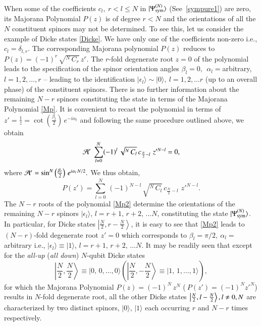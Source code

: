 When some of the coefficients $c_l,\ r< l\leq N$ in $\vert \Psi^{(N)}_{\rm sym}\rangle$ (See~\eqref{sympure1}) are zero, its Majorana Polynomial $P(z)$ is of degree $r<N$ and the orientations of all the $N$ constituent spinors may not be determined. To see this, let us consider the example of Dicke states \eqref{Dicke}. We have only one of the coefficients non-zero i.e., $c_l=\delta_{l,r}$.  The corresponding Majorana polynomial $P(z)$ reduces to  $P(z)=(-1)^r\, \sqrt{^N\, C_r}\, z^{r}$. The $r$-fold degenerate root  $z=0$ of the polynomial leads to the specification of the spinor orientation angles $\beta_l=0,\ \ \alpha_l=$arbitrary, $l=1,2,\ldots, r$ -- leading to the identification $\vert\epsilon_l\rangle\sim \vert 0\rangle,\ l=1,2,\ldots r$ (up to an overall phase) of the constituent spinors. There is no further information about the remaining $N-r$ spinors constituting the state in terms of the Majorana Polynomial \eqref{Mp}.  It is convenient to recast the  polynomial in terms of $z'=\frac{1}{z}=\cot \left(\frac{\beta_l}{2}\right)\,e^{-i\alpha_l}$ and following the same procedure outlined above, we obtain
\begin{equation}
{\cal A'}\  \sum_{l=0}^N (-1)^l\,\sqrt{^N\, C_l}\,  c_{\frac{N}{2}-l}\,  \, z'^{N-l}=0,\label{cmj03}  
\end{equation} 
where  ${\cal A'}=\sin^N\left(\frac{\beta_l}{2}\right)\,e^{i\alpha_l\, N/2}.$ We thus obtain, 
\begin{equation} 
P(z')=\sum_{l=0}^N\, (-1)^{N-l}\, \sqrt{^N\, C_l}\,  c_{\frac{N}{2}-l}\,  \, z'^{N-l}.\label{Mp2}
\end{equation}
The $N-r$ roots of the  polynomial \eqref{Mp2} determine the orientations of the remaining $N-r$ spinors $\vert\epsilon_l\rangle$, $l=r+1,\,r+2,\,\ldots N$, constituting the state $\vert \Psi^{(N)}_{\rm sym}\rangle$. In particular, for Dicke states $\left\vert \frac{N}{2},r-\frac{N}{2}\right\rangle$, it is easy to see that \eqref{Mp2} leads to $(N-r)$-fold degenerate root $z'=0$ which corresponds to $\beta_l=\pi/2,\ \alpha_l=$ arbitrary i.e., $\vert \epsilon_l \rangle \equiv \vert 1 \rangle$, $l=r+1,\,r+2,\, \ldots N$. It may be readily seen that except for the  {\em all-up} ({\em all down}) $N$-qubit Dicke states 
$$\left\vert \frac{N}{2}, \frac{N}{2}\right\rangle\equiv \vert 0,\,0,\ldots,0\rangle\left(\left\vert \frac{N}{2},-\frac{N}{2}\right\rangle\equiv \vert 1,\,1,\ldots,1 \rangle\right),$$ 
for which the Majorana Polynomial  $P(z)=(-1)^N\, z^N$ ($\ P(z')=(-1)^N z'^{N}$) results in $N$-fold degenerate root, all the other  Dicke states $\left\vert \frac{N}{2},l-\frac{N}{2}\right\rangle,\break l\neq 0, N$ are characterized by two distinct spinors, $\vert 0\rangle$, $\vert 1 \rangle$ each occurring $r$ and $N-r$ times respectively. 

